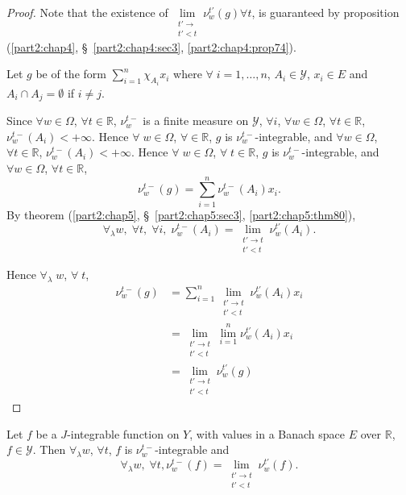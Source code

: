 \begin{proof}
Note that the existence of $\lim\limits_{\substack{t'\to \\t'<t}}
\nu^{t'}_w(g) \forall t$, is guaranteed by proposition
(\ref{part2:chap4}, \S\ \ref{part2:chap4:sec3}, \ref{part2:chap4:prop74}). 

Let $g$ be of the form $\sum\limits^n_{i=1} \chi_{A_i} x_i$ where
$\forall \; i = 1, \ldots , n$, $A_i \in \mathscr{Y}$, $x_i \in E$
and\pageoriginale $A_i \cap A_j = \emptyset$ if $i \neq j$.

Since $\forall w \in \Omega$, $\forall t \in \mathbb{R}$, $\nu^{t-}_w$
is a finite measure on $\mathscr{Y}$, $\forall i$, $\forall w \in
\Omega$, $\forall t \in \mathbb{R}$, $\nu^{t-}_w(A_i) < +
\infty$. Hence $\forall \; w \in \Omega$, $\forall \in \mathbb{R}$,
$g$ is $\nu^{t-}_w$-integrable, and $\forall w \in\Omega$, $\forall
t \in \mathbb{R}$, $\nu^{t-}_w(A_i)<+\infty$. Hence $\forall \;
w\in\Omega$, $\forall \; t\in\mathbb{R}$, $g$ is
$\nu^{t-}_w$-integrable, and $\forall w \in \Omega$, $\forall t \in
\mathbb{R}$, 
$$
\nu^{t-}_w(g) = \sum\limits^n_{i=1} \nu^{t-}_w(A_i) x_i. 
$$
By theorem (\ref{part2:chap5}, \S\ \ref{part2:chap5:sec3}, \ref{part2:chap5:thm80}),
$$
\forall_\lambda w, \; \forall t, \; \forall i, \; \nu^{t-}_w(A_i) =
\lim\limits_{\substack{t' \to t\\t'<t}} \nu^{t'}_w(A_i). 
$$

Hence $\forall_\lambda \; w$, $\forall \; t$,
\begin{align*}
\nu^{t-}_w(g) & = \sum\limits^{n}_{i=1} \lim\limits_{\substack{t'\to
    t\\t'<t}} \nu^{t'}_w (A_i) x_i\\
& = \lim\limits_{\substack{t'\to t\\ t' <t}} \lim\limits^n_{i=1}
\nu^{t'}_w(A_i) x_i\\
& = \lim\limits_{\substack{t'\to t\\t'<t}} \nu^{t'}_w(g)
\end{align*}
\end{proof}

\begin{thm}\label{part2:chap5:thm83}
Let $f$ be a $J$-integrable function on $Y$, with values in a Banach
space $E$ over $\mathbb{R}$, $f \in\mathscr{Y}$. Then $\forall_\lambda
w$, $\forall t$, $f$ is $\nu^{t-}_w$-integrable and 
$$
\forall_\lambda w, \; \forall t, \nu^{t-}_w(f) =
\lim\limits_{\substack{t'\to t\\t'<t}} \nu^{t'}_w(f). 
$$
\end{thm}

